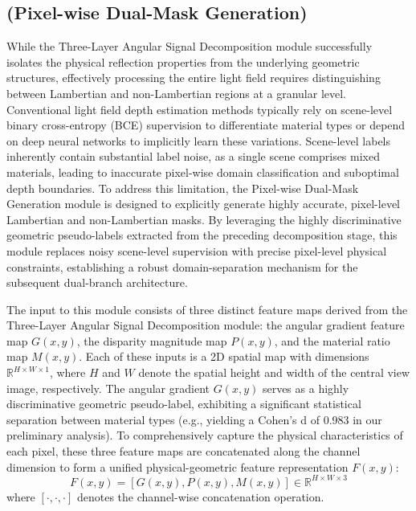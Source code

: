 \subsection{(Pixel-wise Dual-Mask Generation)}

While the Three-Layer Angular Signal Decomposition module successfully isolates the physical reflection properties from the underlying geometric structures, effectively processing the entire light field requires distinguishing between Lambertian and non-Lambertian regions at a granular level. Conventional light field depth estimation methods typically rely on scene-level binary cross-entropy (BCE) supervision to differentiate material types or depend on deep neural networks to implicitly learn these variations. Scene-level labels inherently contain substantial label noise, as a single scene comprises mixed materials, leading to inaccurate pixel-wise domain classification and suboptimal depth boundaries. To address this limitation, the Pixel-wise Dual-Mask Generation module is designed to explicitly generate highly accurate, pixel-level Lambertian and non-Lambertian masks. By leveraging the highly discriminative geometric pseudo-labels extracted from the preceding decomposition stage, this module replaces noisy scene-level supervision with precise pixel-level physical constraints, establishing a robust domain-separation mechanism for the subsequent dual-branch architecture.

The input to this module consists of three distinct feature maps derived from the Three-Layer Angular Signal Decomposition module: the angular gradient feature map $G(x,y)$, the disparity magnitude map $P(x,y)$, and the material ratio map $M(x,y)$. Each of these inputs is a 2D spatial map with dimensions $\mathbb{R}^{H \times W \times 1}$, where $H$ and $W$ denote the spatial height and width of the central view image, respectively. The angular gradient $G(x,y)$ serves as a highly discriminative geometric pseudo-label, exhibiting a significant statistical separation between material types (e.g., yielding a Cohen's d of 0.983 in our preliminary analysis). To comprehensively capture the physical characteristics of each pixel, these three feature maps are concatenated along the channel dimension to form a unified physical-geometric feature representation $F(x,y)$:
\begin{equation}
\label{eq:eq8}
F(x,y) = [G(x,y), P(x,y), M(x,y)] \in \mathbb{R}^{H \times W \times 3}
\end{equation}
where $[\cdot, \cdot, \cdot]$ denotes the channel-wise concatenation operation.

